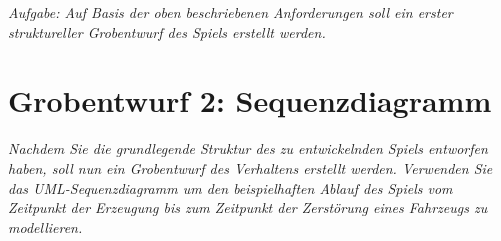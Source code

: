 \documentclass{article}
\begin{document}
\textit{Aufgabe: Auf Basis der oben beschriebenen Anforderungen soll ein erster struktureller Grobentwurf des Spiels erstellt werden.}\\

\newpage
\section{Grobentwurf 2: Sequenzdiagramm}
\textit{Nachdem Sie die grundlegende Struktur des zu entwickelnden Spiels entworfen haben, soll nun ein Grobentwurf des Verhaltens erstellt werden. Verwenden Sie das UML-Sequenzdiagramm um den beispielhaften Ablauf des Spiels vom Zeitpunkt der Erzeugung bis zum Zeitpunkt der Zerstörung eines Fahrzeugs zu modellieren.}
\end{document}
